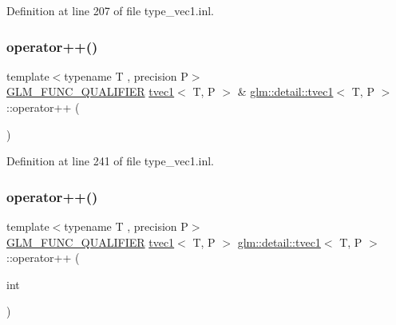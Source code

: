 Definition at line 207 of file type\+\_\+vec1.\+inl.

\mbox{\label{structglm_1_1detail_1_1tvec1_ae4514c5de0b75209187c80ed65fdd392}} 
\subsubsection{\texorpdfstring{operator++()}{operator++()}\hspace{0.1cm}{\footnotesize\ttfamily [1/2]}}
{\footnotesize\ttfamily template$<$typename T , precision P$>$ \\
\hyperlink{setup_8hpp_a33fdea6f91c5f834105f7415e2a64407}{G\+L\+M\+\_\+\+F\+U\+N\+C\+\_\+\+Q\+U\+A\+L\+I\+F\+I\+ER} \hyperlink{structglm_1_1detail_1_1tvec1}{tvec1}$<$ T, P $>$ \& \hyperlink{structglm_1_1detail_1_1tvec1}{glm\+::detail\+::tvec1}$<$ T, P $>$\+::operator++ (\begin{DoxyParamCaption}{ }\end{DoxyParamCaption})}



Definition at line 241 of file type\+\_\+vec1.\+inl.

\mbox{\label{structglm_1_1detail_1_1tvec1_a215f0e9af490b7cfce0639fc34e67df7}} 
\subsubsection{\texorpdfstring{operator++()}{operator++()}\hspace{0.1cm}{\footnotesize\ttfamily [2/2]}}
{\footnotesize\ttfamily template$<$typename T , precision P$>$ \\
\hyperlink{setup_8hpp_a33fdea6f91c5f834105f7415e2a64407}{G\+L\+M\+\_\+\+F\+U\+N\+C\+\_\+\+Q\+U\+A\+L\+I\+F\+I\+ER} \hyperlink{structglm_1_1detail_1_1tvec1}{tvec1}$<$ T, P $>$ \hyperlink{structglm_1_1detail_1_1tvec1}{glm\+::detail\+::tvec1}$<$ T, P $>$\+::operator++ (\begin{DoxyParamCaption}\item[{int}]{ }\end{DoxyParamCaption})}



